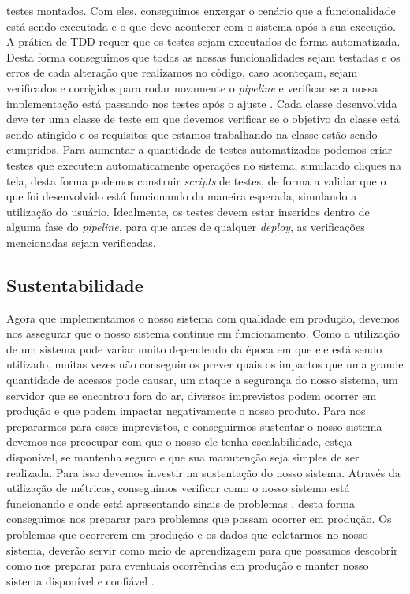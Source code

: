         testes montados. Com eles, conseguimos enxergar o cenário que a funcionalidade
        está sendo executada e o que deve acontecer com o sistema após a sua execução.
        \newline
        A prática de TDD requer que os testes sejam executados de forma automatizada.
        Desta forma conseguimos que todas as nossas funcionalidades sejam testadas
        e os erros de cada alteração que realizamos no código, caso aconteçam,
        sejam verificados e corrigidos para rodar novamente o \textit{pipeline}
        e verificar se a nossa implementação está passando nos testes após o ajuste
        \cite{ContinuousDelivery}. Cada classe desenvolvida deve ter uma classe
        de teste em que devemos verificar se o objetivo da classe está sendo atingido
        e os requisitos que estamos trabalhando na classe estão sendo cumpridos.
        Para aumentar a quantidade de testes automatizados podemos criar testes
        que executem automaticamente operações no sistema, simulando cliques na
        tela, desta forma podemos construir \textit{scripts} de testes, de forma
        a validar que o que foi desenvolvido está funcionando da maneira esperada,
        simulando a utilização do usuário. Idealmente, os testes devem estar inseridos
        dentro de alguma fase do \textit{pipeline}, para que antes de qualquer
        \textit{deploy}, as verificações mencionadas sejam verificadas. \newline

      \subsection{Sustentabilidade}
        Agora que implementamos o nosso sistema com qualidade em produção, devemos
        nos assegurar que o nosso sistema continue em funcionamento. Como a utilização
        de um sistema pode variar muito dependendo da época em que ele está sendo
        utilizado, muitas vezes não conseguimos prever quais os impactos que uma
        grande quantidade de acessos pode causar, um ataque a segurança do nosso
        sistema, um servidor que se encontrou fora do ar, diversos imprevistos podem
        ocorrer em produção e que podem impactar negativamente o nosso produto. \newline
        Para nos prepararmos para esses imprevistos, e conseguirmos sustentar o
        nosso sistema devemos nos preocupar com que o nosso ele tenha escalabilidade,
        esteja disponível, se mantenha seguro e que sua manutenção seja simples
        de ser realizada. Para isso devemos investir na sustentação do nosso sistema.
        Através da utilização de métricas, conseguimos verificar como o nosso sistema
        está funcionando e onde está apresentando sinais de problemas \cite{
        TheDevOpsHandbook}, desta forma conseguimos nos preparar para problemas
        que possam ocorrer em produção. Os problemas que ocorrerem em produção e
        os dados que coletarmos no nosso sistema, deverão servir como meio de
        aprendizagem para que possamos descobrir como nos preparar para eventuais
        ocorrências em produção e manter nosso sistema disponível e confiável \cite{
        SiteReliabilityEngineering}.
